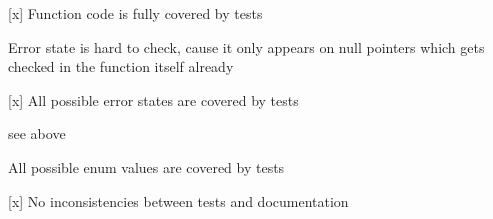 {\ttfamily }

{\ttfamily 
\begin{DoxyItemize}
\item \mbox{[}x\mbox{]} Function code is fully covered by tests
\begin{DoxyItemize}
\item Error state is hard to check, cause it only appears on null pointers which gets checked in the function itself already
\end{DoxyItemize}
\item \mbox{[}x\mbox{]} All possible error states are covered by tests
\begin{DoxyItemize}
\item see above
\end{DoxyItemize}
\item All possible enum values are covered by tests
\item \mbox{[}x\mbox{]} No inconsistencies between tests and documentation
\end{DoxyItemize}}

{\ttfamily }

{\ttfamily  }

{\ttfamily }